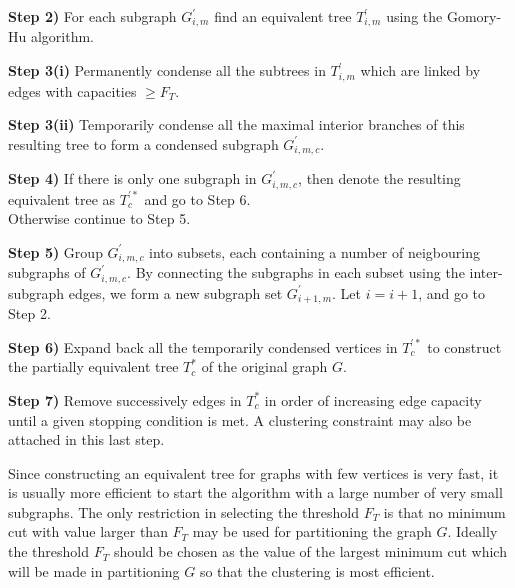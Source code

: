             \vspace{3mm}
            \noindent \textbf{Step 2)} For each subgraph $G^{'}_{i,m}$ find an equivalent tree $T^{'}_{i,m}$ using the Gomory-Hu algorithm.
            
            \vspace{3mm}
            \noindent \textbf{Step 3(i)} Permanently condense all the subtrees in $T^{'}_{i,m}$ which are linked by edges with capacities $\geq F_T$.
            
            \noindent \textbf{Step 3(ii)} Temporarily condense all the maximal interior branches of this resulting tree to form a condensed subgraph $G^{'}_{i,m,c}$.
            
            \vspace{3mm}
            \noindent \textbf{Step 4)}  If there is only one subgraph in {$G^{'}_{i,m,c}$}, then denote the resulting equivalent tree as $T^{'*}_c$ and go to Step 6. \\
            Otherwise continue to Step 5.
            
            \vspace{3mm}
            \noindent \textbf{Step 5)} Group {$G^{'}_{i,m,c}$} into subsets, each containing a number of neigbouring subgraphs of {$G^{'}_{i,m,c}$}. By connecting the subgraphs in each subset using the inter-subgraph edges, we form a new subgraph set ${G^{'}_{i+1,m}}$. Let $i = i+1$, and go to Step 2.
            
            \vspace{3mm}
            \noindent \textbf{Step 6)} Expand back all the temporarily condensed vertices in $T^{'*}_c$ to construct the partially equivalent tree $T^*_c$ of the original graph $G$.
            
            \vspace{3mm}
            \noindent \textbf{Step 7)} Remove successively edges in $T^*_c$ in order of increasing edge capacity until a given stopping condition is met. A clustering constraint may also be attached in this last step.

            \vspace{5mm}
            \noindent Since constructing an equivalent tree for graphs with few vertices is very fast, it is usually more efficient to start the algorithm with a large number of very small subgraphs. The only restriction in selecting the threshold $F_T$ is that no minimum cut with value larger than $F_T$ may be used for partitioning the graph $G$. Ideally the threshold $F_T$ should be chosen as the value of the largest minimum cut which will be made in partitioning $G$ so that the clustering is most efficient.


